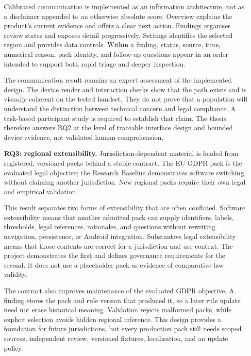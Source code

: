 Calibrated communication is implemented as an information architecture, not as a disclaimer appended to an otherwise absolute score. Overview explains the product's current evidence and offers a clear next action. Findings organises review states and exposes detail progressively. Settings identifies the selected region and provides data controls. Within a finding, status, source, time, numerical reason, pack identity, and follow-up questions appear in an order intended to support both rapid triage and deeper inspection.

The communication result remains an expert assessment of the implemented design. The device render and interaction checks show that the path exists and is visually coherent on the tested handset. They do not prove that a population will understand the distinction between technical concern and legal compliance. A task-based participant study is required to establish that claim. The thesis therefore answers RQ2 at the level of traceable interface design and bounded device evidence, not validated human comprehension.

\textbf{RQ3: regional extensibility.} Jurisdiction-dependent material is loaded from registered, versioned packs behind a stable contract. The EU GDPR pack is the evaluated legal objective; the Research Baseline demonstrates software switching without claiming another jurisdiction. New regional packs require their own legal and empirical validation.

This result separates two forms of extensibility that are often conflated. Software extensibility means that another admitted pack can supply identifiers, labels, thresholds, legal references, rationales, and questions without rewriting navigation, persistence, or Android integration. Substantive legal extensibility means that those contents are correct for a jurisdiction and use context. The project demonstrates the first and defines governance requirements for the second. It does not use a placeholder pack as evidence of comparative-law validity.

The contract also improves maintenance of the evaluated GDPR objective. A finding stores the pack and rule version that produced it, so a later rule update need not erase historical meaning. Validation rejects malformed packs, while explicit selection avoids hidden regional inference. This design provides a foundation for future jurisdictions, but every production pack still needs scoped sources, independent review, versioned fixtures, localisation, and an update policy.

